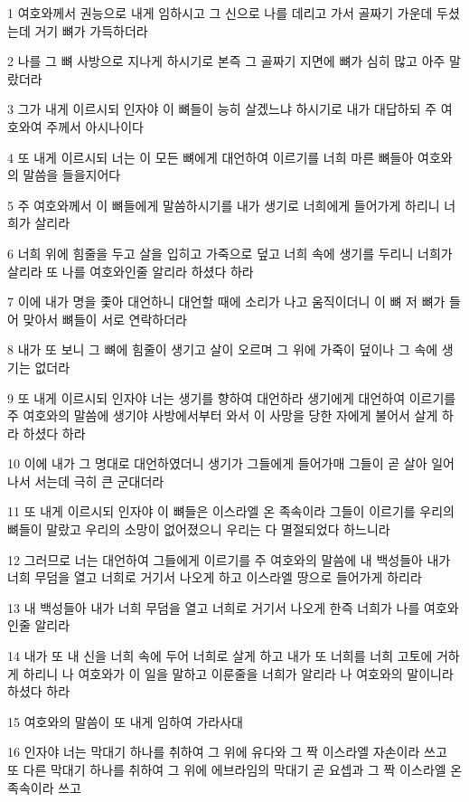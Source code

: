 \par 1 여호와께서 권능으로 내게 임하시고 그 신으로 나를 데리고 가서 골짜기 가운데 두셨는데 거기 뼈가 가득하더라
\par 2 나를 그 뼈 사방으로 지나게 하시기로 본즉 그 골짜기 지면에 뼈가 심히 많고 아주 말랐더라
\par 3 그가 내게 이르시되 인자야 이 뼈들이 능히 살겠느냐 하시기로 내가 대답하되 주 여호와여 주께서 아시나이다
\par 4 또 내게 이르시되 너는 이 모든 뼈에게 대언하여 이르기를 너희 마른 뼈들아 여호와의 말씀을 들을지어다
\par 5 주 여호와께서 이 뼈들에게 말씀하시기를 내가 생기로 너희에게 들어가게 하리니 너희가 살리라
\par 6 너희 위에 힘줄을 두고 살을 입히고 가죽으로 덮고 너희 속에 생기를 두리니 너희가 살리라 또 나를 여호와인줄 알리라 하셨다 하라
\par 7 이에 내가 명을 좇아 대언하니 대언할 때에 소리가 나고 움직이더니 이 뼈 저 뼈가 들어 맞아서 뼈들이 서로 연락하더라
\par 8 내가 또 보니 그 뼈에 힘줄이 생기고 살이 오르며 그 위에 가죽이 덮이나 그 속에 생기는 없더라
\par 9 또 내게 이르시되 인자야 너는 생기를 향하여 대언하라 생기에게 대언하여 이르기를 주 여호와의 말씀에 생기야 사방에서부터 와서 이 사망을 당한 자에게 불어서 살게 하라 하셨다 하라
\par 10 이에 내가 그 명대로 대언하였더니 생기가 그들에게 들어가매 그들이 곧 살아 일어나서 서는데 극히 큰 군대더라
\par 11 또 내게 이르시되 인자야 이 뼈들은 이스라엘 온 족속이라 그들이 이르기를 우리의 뼈들이 말랐고 우리의 소망이 없어졌으니 우리는 다 멸절되었다 하느니라
\par 12 그러므로 너는 대언하여 그들에게 이르기를 주 여호와의 말씀에 내 백성들아 내가 너희 무덤을 열고 너희로 거기서 나오게 하고 이스라엘 땅으로 들어가게 하리라
\par 13 내 백성들아 내가 너희 무덤을 열고 너희로 거기서 나오게 한즉 너희가 나를 여호와인줄 알리라
\par 14 내가 또 내 신을 너희 속에 두어 너희로 살게 하고 내가 또 너희를 너희 고토에 거하게 하리니 나 여호와가 이 일을 말하고 이룬줄을 너희가 알리라 나 여호와의 말이니라 하셨다 하라
\par 15 여호와의 말씀이 또 내게 임하여 가라사대
\par 16 인자야 너는 막대기 하나를 취하여 그 위에 유다와 그 짝 이스라엘 자손이라 쓰고 또 다른 막대기 하나를 취하여 그 위에 에브라임의 막대기 곧 요셉과 그 짝 이스라엘 온 족속이라 쓰고
